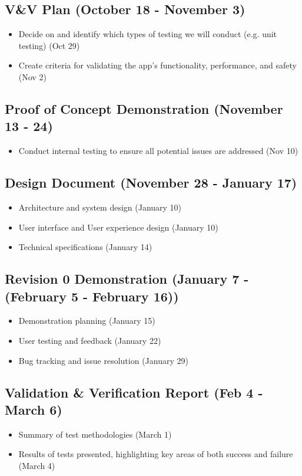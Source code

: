 \documentclass{article}
\begin{document}
	\subsection{V\&V Plan (October 18 - November 3)}
	\begin{itemize}
		\item Decide on and identify which types of testing we will conduct (e.g. unit testing) (Oct 29)
		\item Create criteria for validating the app’s functionality, performance, and safety (Nov 2)
	\end{itemize}

	\subsection{Proof of Concept Demonstration (November 13 - 24)}
	\begin{itemize}
		\item Conduct internal testing to ensure all potential issues are addressed (Nov 10)
	\end{itemize}

	\subsection{Design Document (November 28 - January 17)}
	\begin{itemize}
		\item Architecture and system design (January 10)
		\item User interface and User experience design (January 10)
		\item Technical specifications (January 14)
	\end{itemize}

	\subsection{Revision 0 Demonstration (January 7 - (February 5 - February 16))}
	\begin{itemize}
		\item Demonstration planning (January 15)
		\item User testing and feedback (January 22)
		\item Bug tracking and issue resolution (January 29)
	\end{itemize}

	\subsection{Validation \& Verification Report (Feb 4 - March 6)}
	\begin{itemize}
		\item Summary of test methodologies (March 1)
		\item Results of tests presented, highlighting key areas of both success and failure (March 4)
	\end{itemize}
\end{document}

